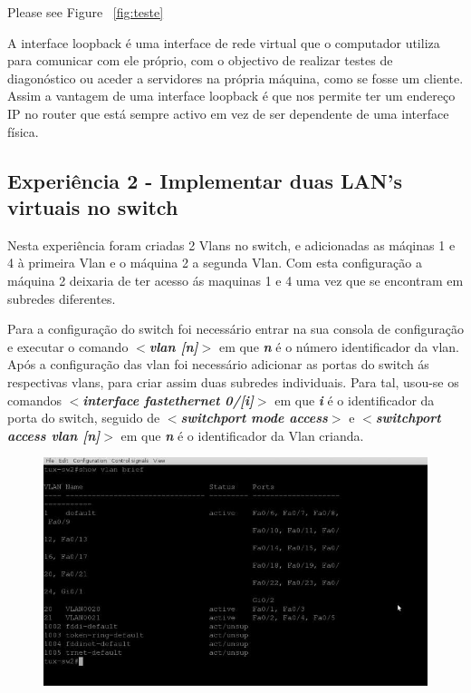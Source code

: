 \documentclass[a4paper]{article}
\begin{document}
\pagebreak

Please see Figure ~\autoref{fig:teste}

A interface loopback é uma interface de rede virtual que o computador utiliza para comunicar com ele próprio, com o objectivo de realizar testes de diagonóstico ou aceder a servidores na própria máquina, como se fosse um cliente. Assim a vantagem de uma interface loopback é que nos permite ter um endereço IP no router que está sempre activo em vez de ser dependente de uma interface física.

\subsection{Experiência 2 - Implementar duas LAN's virtuais no switch}
Nesta experiência foram criadas 2 Vlans no switch, e adicionadas as máqinas 1 e 4 à primeira Vlan e o máquina 2 a segunda Vlan. Com esta configuração a máquina 2 deixaria de ter acesso ás maquinas 1 e 4 uma vez que se encontram em subredes diferentes.


Para a configuração do switch foi necessário entrar na sua consola de configuração e executar o comando \textbf{\textit{$<$vlan [n]$>$}} em que \textbf{\textit{n}} é o número identificador da vlan. Após a configuração das vlan foi necessário adicionar as portas do switch ás respectivas vlans, para criar assim duas subredes individuais. Para tal, usou-se os comandos \textbf{\textit{$<$interface fastethernet 0/[i]$>$}} em que \textbf{\textit{i}} é o identificador da porta do switch, seguido de \textbf{\textit{$<$switchport mode access$>$}} e \textbf{\textit{$<$switchport access vlan [n]$>$}} em que \textit{\textbf{n}} é o identificador da Vlan crianda.

\begin{figure}[h!]
\centering
\includegraphics[scale=0.3]{res/image3.jpg}
\end{figure}
\end{document}
